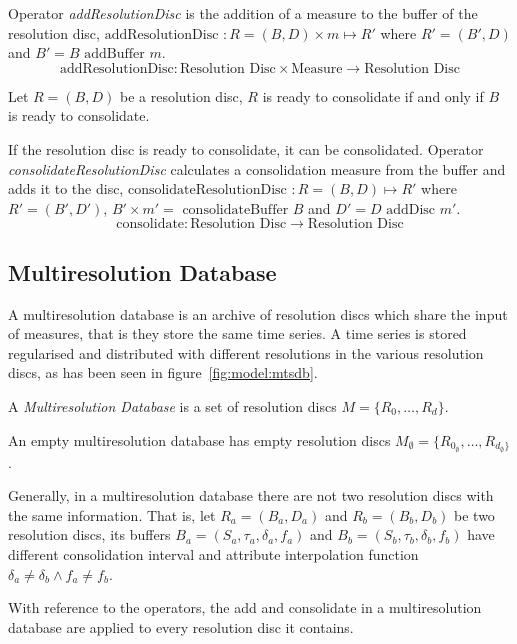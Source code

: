Operator \emph{addResolutionDisc} is the addition of a measure to the
buffer of the resolution disc, $\text{addResolutionDisc } : R=(B,D) \times m \mapsto R'$ where
$R'= (B',D)$ and $B'= B \text{ addBuffer } m$.
\[
\text{addResolutionDisc}: \text{Resolution Disc} \times \text{Measure}
\longrightarrow \text{Resolution Disc}
\]

Let $R=(B,D)$ be a resolution disc, $R$ is ready to consolidate if and
only if $B$ is ready to consolidate.

If the resolution disc is ready to consolidate, it can be
consolidated.  Operator \emph{consolidateResolutionDisc} calculates a
consolidation measure from the buffer and adds it to the disc,
$\text{consolidateResolutionDisc } : R=(B,D) \mapsto R'$ where $R'=
(B',D')$, $B' \times m'= \text{ consolidateBuffer } B $ and $ D'= D
\text{ addDisc } m'$.
\[
\text{consolidate}: \text{Resolution Disc} \longrightarrow
\text{Resolution Disc}
\]




\subsection{Multiresolution Database}\label{sec:model:rrd}

A multiresolution database is an archive of resolution discs which
share the input of measures, that is they store the same time
series. A time series is stored regularised and distributed with
different resolutions in the various resolution discs, as has been seen
in figure~\ref{fig:model:mtsdb}.

\begin{definition}
  A \emph{Multiresolution Database} is a set of resolution discs
  $M=\{R_0,\dotsc,R_d\}$.
\end{definition}

An empty multiresolution database has empty resolution discs $M_{\emptyset}=\{R_{0_{\emptyset}},\dotsc,R_{d_{\emptyset}\}}$. 
 
Generally, in a multiresolution database there are not two resolution discs
with the same information. That is, let $R_a = (B_a, D_a)$ and $R_b =
(B_b, D_b)$ be two resolution discs, its buffers
$B_a=(S_a,\tau_a,\delta_a,f_a)$ and $B_b=(S_b,\tau_b,\delta_b,f_b)$
have different consolidation interval and attribute interpolation function
$\delta_a \neq \delta_b \wedge f_a \neq f_b$.


With reference to the operators, the add and consolidate in a
multiresolution database are applied to every resolution disc it
contains.


